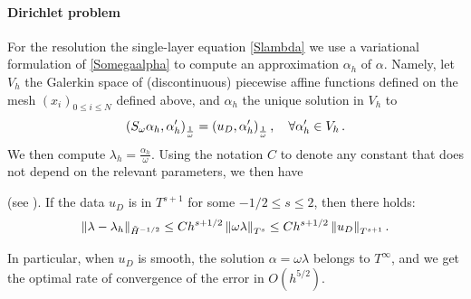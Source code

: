\documentclass[a4paper]{article}
\begin{document}
\paragraph{Dirichlet problem} For the resolution the single-layer equation \eqref{Slambda} we use a variational formulation of \eqref{Somegaalpha} 
to compute an approximation $\alpha_h$ of $\alpha$. Namely, let $V_h$ the Galerkin space of (discontinuous) piecewise affine functions 
defined on the mesh $(x_i)_{0\leq i \leq N}$ defined above, and $\alpha_h$ the unique solution in $V_h$ to
\[ \left( S_\omega \alpha_h,\alpha_h'\right)_\frac{1}{\omega} = \left( u_D,\alpha_h'\right)_\frac{1}{\omega}, \quad \forall \alpha_h' \in V_h\,.\]
We then compute $\lambda_h = \frac{\alpha_h}{\omega}$. Using the notation $C$ to denote any constant that does not depend on the relevant parameters, we then have
\begin{theorem}(see \cite{averseng}).
	If the data $u_D$ is in $T^{s+1}$ for some $-1/2 \leq s \leq 2$, then there holds:
	\[ \left\|\lambda - \lambda_h\right\|_{\tilde{H}^{-1/2}} \leq C h^{s+1/2} \left\|\omega \lambda\right\|_{T^{s}}\leq C h^{s+1/2} \left\|u_D\right\|_{T^{s+1}}.\]
	\label{theOrdreCVDirichlet}
\end{theorem}
In particular, when $u_D$ is smooth, the solution $\alpha = \omega \lambda$ belongs to $T^{\infty}$, and we get the optimal rate of convergence of the error in  
$O(h^{5/2})$.
\end{document}
